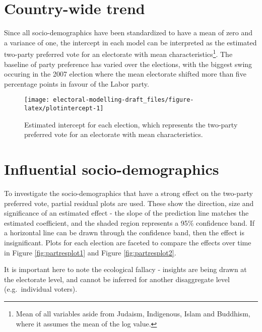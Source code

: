 \documentclass[openany]{book}
\let\rmarkdownfootnote\footnote%
\def\footnote{\protect\rmarkdownfootnote}
\begin{document}
\hypertarget{country-wide-trend}{%
\section{Country-wide trend}\label{country-wide-trend}}

Since all socio-demographics have been standardized to have a mean of zero and a variance of one, the intercept in each model can be interpreted as the estimated two-party preferred vote for an electorate with mean characteristics\footnote{Mean of all variables aside from Judaism, Indigenous, Islam and Buddhism, where it assumes the mean of the log value.}. The baseline of party preference has varied over the elections, with the biggest swing occuring in the 2007 election where the mean electorate shifted more than five percentage points in favour of the Labor party.

\begin{figure}[h]

{\centering \texttt{[image: electoral-modelling-draft\_files/figure-latex/plotintercept-1]} 

}

\caption{Estimated intercept for each election, which represents the two-party preferred vote for an electorate with mean characteristics.}\label{fig:plotintercept}
\end{figure}

\hypertarget{influential-socio-demographics}{%
\section{Influential socio-demographics}\label{influential-socio-demographics}}

To investigate the socio-demographics that have a strong effect on the two-party preferred vote, partial residual plots are used. These show the direction, size and significance of an estimated effect - the slope of the prediction line matches the estimated coefficient, and the shaded region represents a 95\% confidence band. If a horizontal line can be drawn through the confidence band, then the effect is insignificant. Plots for each election are faceted to compare the effects over time in Figure \ref{fig:partresplot1} and Figure \ref{fig:partresplot2}.

It is important here to note the ecological fallacy - insights are being drawn at the electorate level, and cannot be inferred for another disaggregate level (e.g.~individual voters).
\end{document}
